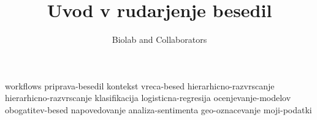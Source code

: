 \documentclass[symmetric, justified, a4paper]{tufte-book}
\title{Uvod v rudarjenje besedil}
\author[Biolab and Collaborators]{Biolab and Collaborators}
\begin{document}
\frontmatter

\maketitle



\tableofcontents

% 

\mainmatter



{workflows}
{priprava-besedil}
{kontekst}
{vreca-besed}
{hierarhicno-razvrscanje}
{hierarhicno-razvrscanje}
{klasifikacija}
{logisticna-regresija}
{ocenjevanje-modelov}
{obogatitev-besed}
{napovedovanje}
{analiza-sentimenta}
{geo-oznacevanje}
{moji-podatki}



\backmatter




\printindex
\end{document}
